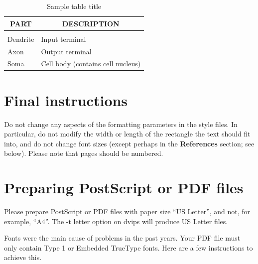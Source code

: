\documentclass{article} %
\begin{document}
\begin{table}[t]
\caption{Sample table title}
\label{sample-table}
\begin{center}
\begin{tabular}{ll}
\multicolumn{1}{c}{\bf PART}  &\multicolumn{1}{c}{\bf DESCRIPTION}
\\ \hline \\
Dendrite         &Input terminal \\
Axon             &Output terminal \\
Soma             &Cell body (contains cell nucleus) \\
\end{tabular}
\end{center}
\end{table}

\section{Final instructions}

Do not change any aspects of the formatting parameters in the style files.
In particular, do not modify the width or length of the rectangle the text
should fit into, and do not change font sizes (except perhaps in the
\textbf{References} section; see below). Please note that pages should be
numbered.

\section{Preparing PostScript or PDF files}

Please prepare PostScript or PDF files with paper size ``US Letter'', and
not, for example, ``A4''. The -t
letter option on dvips will produce US Letter files.

Fonts were the main cause of problems in the past years. Your PDF file must
only contain Type 1 or Embedded TrueType fonts. Here are a few instructions
to achieve this.
\end{document}

